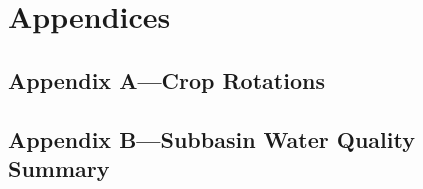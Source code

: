 \section{Appendices}
	\subsection{Appendix A---Crop Rotations}
	\subsection{Appendix B---Subbasin Water Quality Summary}